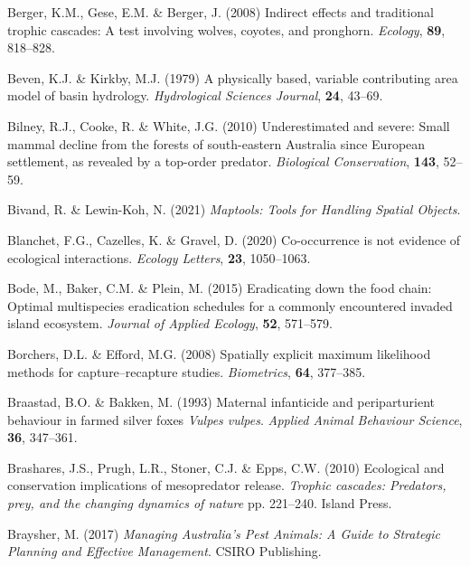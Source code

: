 \documentclass[11pt,a4paper,titlepage,twoside,openright]{style/unimelbthesis}
\begin{document}
\begin{mainmatter}
\leavevmode\hypertarget{ref-berger2008indirect}{}%
Berger, K.M., Gese, E.M. \& Berger, J. (2008) Indirect effects and traditional trophic cascades: A test involving wolves, coyotes, and pronghorn. \emph{Ecology}, \textbf{89}, 818--828.

\leavevmode\hypertarget{ref-beven1979physically}{}%
Beven, K.J. \& Kirkby, M.J. (1979) A physically based, variable contributing area model of basin hydrology. \emph{Hydrological Sciences Journal}, \textbf{24}, 43--69.

\leavevmode\hypertarget{ref-bilney2010underestimated}{}%
Bilney, R.J., Cooke, R. \& White, J.G. (2010) Underestimated and severe: Small mammal decline from the forests of south-eastern Australia since European settlement, as revealed by a top-order predator. \emph{Biological Conservation}, \textbf{143}, 52--59.

\leavevmode\hypertarget{ref-maptools}{}%
Bivand, R. \& Lewin-Koh, N. (2021) \emph{Maptools: Tools for Handling Spatial Objects}.

\leavevmode\hypertarget{ref-guillaume2020co}{}%
Blanchet, F.G., Cazelles, K. \& Gravel, D. (2020) Co-occurrence is not evidence of ecological interactions. \emph{Ecology Letters}, \textbf{23}, 1050--1063.

\leavevmode\hypertarget{ref-bode2015eradicating}{}%
Bode, M., Baker, C.M. \& Plein, M. (2015) Eradicating down the food chain: Optimal multispecies eradication schedules for a commonly encountered invaded island ecosystem. \emph{Journal of Applied Ecology}, \textbf{52}, 571--579.

\leavevmode\hypertarget{ref-borchers2008spatially}{}%
Borchers, D.L. \& Efford, M.G. (2008) Spatially explicit maximum likelihood methods for capture--recapture studies. \emph{Biometrics}, \textbf{64}, 377--385.

\leavevmode\hypertarget{ref-braastad1993maternal}{}%
Braastad, B.O. \& Bakken, M. (1993) Maternal infanticide and periparturient behaviour in farmed silver foxes \emph{Vulpes vulpes}. \emph{Applied Animal Behaviour Science}, \textbf{36}, 347--361.

\leavevmode\hypertarget{ref-brashares2010ecological}{}%
Brashares, J.S., Prugh, L.R., Stoner, C.J. \& Epps, C.W. (2010) Ecological and conservation implications of mesopredator release. \emph{Trophic cascades: Predators, prey, and the changing dynamics of nature} pp. 221--240. Island Press.

\leavevmode\hypertarget{ref-braysher2017managing}{}%
Braysher, M. (2017) \emph{Managing Australia's Pest Animals: A Guide to Strategic Planning and Effective Management}. CSIRO Publishing.


\end{mainmatter}
\end{document}
